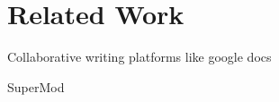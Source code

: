 

\section{Related Work}
\label{sec:related}

Collaborative writing platforms like google docs 

SuperMod~\cite{schwagerl15}

\endinput